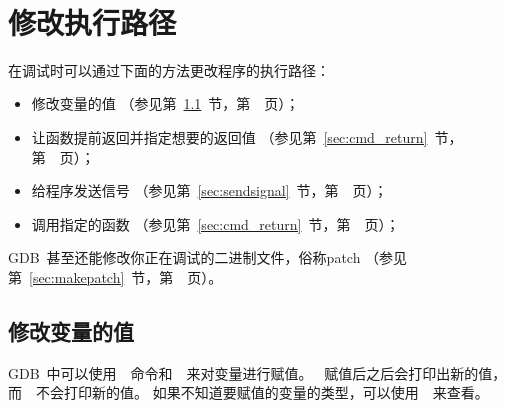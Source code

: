 \noindent
{} \\



\section{修改执行路径}
在调试时可以通过下面的方法更改程序的执行路径：
\begin{itemize}
\item 修改变量的值
（参见第~\ref{sec:modvar}~节，第~\pageref{sec:modvar}~页）；

\item 让函数提前返回并指定想要的返回值
（参见第~\ref{sec:cmd_return}~节，第~\pageref{sec:cmd_return}~页）；

\item 给程序发送信号
（参见第~\ref{sec:sendsignal}~节，第~\pageref{sec:sendsignal}~页）；

\item 调用指定的函数
（参见第~\ref{sec:cmd_return}~节，第~\pageref{sec:cmd_return}~页）；

\end{itemize}

GDB~甚至还能修改你正在调试的二进制文件，俗称patch
（参见第~\ref{sec:makepatch}~节，第~\pageref{sec:makepatch}~页）。

\subsection{修改变量的值}
\label{sec:modvar}

GDB~中可以使用~~命令和~~来对变量进行赋值。
~赋值后之后会打印出新的值，
而~~不会打印新的值。
如果不知道要赋值的变量的类型，可以使用~~来查看。

\noindent
{}


\noindent
{}

